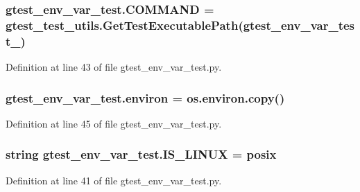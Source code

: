 \subsubsection[{\texorpdfstring{C\+O\+M\+M\+A\+ND}{COMMAND}}]{\setlength{\rightskip}{0pt plus 5cm}gtest\+\_\+env\+\_\+var\+\_\+test.\+C\+O\+M\+M\+A\+ND = {\bf gtest\+\_\+test\+\_\+utils.\+Get\+Test\+Executable\+Path}(\textquotesingle{}gtest\+\_\+env\+\_\+var\+\_\+test\+\_\+\textquotesingle{})}\hypertarget{namespacegtest__env__var__test_a36e02e39934750d022966df31c568a53}{}\label{namespacegtest__env__var__test_a36e02e39934750d022966df31c568a53}


Definition at line 43 of file gtest\+\_\+env\+\_\+var\+\_\+test.\+py.

\subsubsection[{\texorpdfstring{environ}{environ}}]{\setlength{\rightskip}{0pt plus 5cm}gtest\+\_\+env\+\_\+var\+\_\+test.\+environ = os.\+environ.\+copy()}\hypertarget{namespacegtest__env__var__test_ac671a59c1b805f7e9511e91380865cda}{}\label{namespacegtest__env__var__test_ac671a59c1b805f7e9511e91380865cda}


Definition at line 45 of file gtest\+\_\+env\+\_\+var\+\_\+test.\+py.

\subsubsection[{\texorpdfstring{I\+S\+\_\+\+L\+I\+N\+UX}{IS_LINUX}}]{\setlength{\rightskip}{0pt plus 5cm}string gtest\+\_\+env\+\_\+var\+\_\+test.\+I\+S\+\_\+\+L\+I\+N\+UX = \textquotesingle{}posix\textquotesingle{}}\hypertarget{namespacegtest__env__var__test_a33b1e2e9afe9d59d75503de4a1297486}{}\label{namespacegtest__env__var__test_a33b1e2e9afe9d59d75503de4a1297486}


Definition at line 41 of file gtest\+\_\+env\+\_\+var\+\_\+test.\+py.

